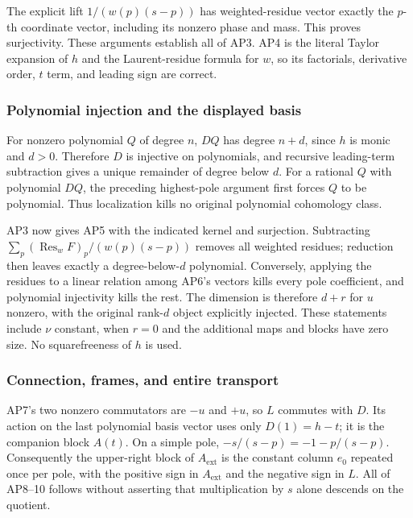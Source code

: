 \documentclass{article}
\begin{document}
The explicit lift \(1/(w(p)(s-p))\) has weighted-residue vector exactly the \(p\)-th coordinate vector, including its nonzero phase and mass. This proves surjectivity. These arguments establish all of AP3. AP4 is the literal Taylor expansion of \(h\) and the Laurent-residue formula for \(w\), so its factorials, derivative order, \(t\) term, and leading sign are correct.

\subsubsection{Polynomial injection and the displayed basis}\label{endpoint-analytic_pole_review--polynomial-injection-and-the-displayed-basis}

For nonzero polynomial \(Q\) of degree \(n\), \(DQ\) has degree \(n+d\), since \(h\) is monic and \(d>0\). Therefore \(D\) is injective on polynomials, and recursive leading-term subtraction gives a unique remainder of degree below \(d\). For a rational \(Q\) with polynomial \(DQ\), the preceding highest-pole argument first forces \(Q\) to be polynomial. Thus localization kills no original polynomial cohomology class.

AP3 now gives AP5 with the indicated kernel and surjection. Subtracting \(\sum_p(\operatorname{Res}_w F)_p/(w(p)(s-p))\) removes all weighted residues; reduction then leaves exactly a degree-below-\(d\) polynomial. Conversely, applying the residues to a linear relation among AP6's vectors kills every pole coefficient, and polynomial injectivity kills the rest. The dimension is therefore \(d+r\) for \(u\) nonzero, with the original rank-\(d\) object explicitly injected. These statements include \(\nu\) constant, when \(r=0\) and the additional maps and blocks have zero size. No squarefreeness of \(h\) is used.

\subsubsection{Connection, frames, and entire transport}\label{endpoint-analytic_pole_review--connection-frames-and-entire-transport}

AP7's two nonzero commutators are \(-u\) and \(+u\), so \(L\) commutes with \(D\). Its action on the last polynomial basis vector uses only \(D(1)=h-t\); it is the companion block \(A(t)\). On a simple pole, \(-s/(s-p)=-1-p/(s-p)\). Consequently the upper-right block of \(A_{\mathrm{ext}}\) is the constant column \(e_0\) repeated once per pole, with the positive sign in \(A_{\mathrm{ext}}\) and the negative sign in \(L\). All of AP8--10 follows without asserting that multiplication by \(s\) alone descends on the quotient.
\end{document}
